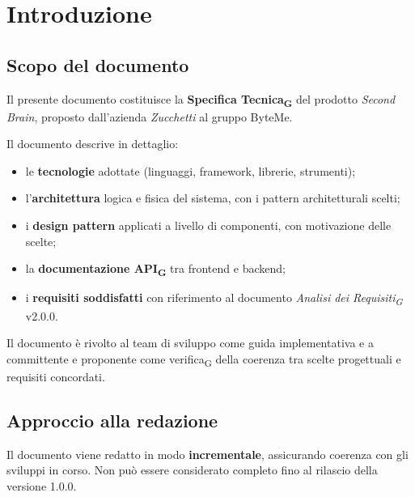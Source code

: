 \documentclass[11pt,a4paper]{article}
\newcommand{\gls}[1]{#1\textsubscript{G}}
\begin{document}
\newpage

\tableofcontents
\thispagestyle{empty}
\newpage

{} 
\listoffigures 
\newpage

\setcounter{page}{1}

\section{Introduzione}
\subsection{Scopo del documento}
Il presente documento costituisce la \textbf{\gls{Specifica Tecnica}} del prodotto \textit{Second Brain}, proposto dall'azienda \textit{Zucchetti} al gruppo ByteMe.
 
Il documento descrive in dettaglio:
\begin{itemize}
  \item le \textbf{tecnologie} adottate (linguaggi, framework, librerie, strumenti);
  \item l'\textbf{architettura} logica e fisica del sistema, con i pattern architetturali scelti;
  \item i \textbf{design pattern} applicati a livello di componenti, con motivazione delle scelte;
  \item la \textbf{documentazione \gls{API}} tra frontend e backend;
  \item i \textbf{requisiti soddisfatti} con riferimento al documento \textit{\gls{Analisi dei Requisiti}} v2.0.0.
\end{itemize}
 
Il documento è rivolto al team di sviluppo come guida implementativa e a
committente e proponente come \gls{verifica} della coerenza tra scelte progettuali e requisiti concordati.
 
\subsection{Approccio alla redazione}
Il documento viene redatto in modo \textbf{incrementale}, assicurando coerenza con gli sviluppi in corso. Non può essere considerato completo fino al rilascio della versione 1.0.0.
\end{document}
